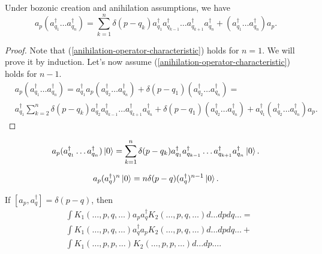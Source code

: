 \documentclass[main.tex]{subfiles}
\begin{document}
\begin{proposition}
Under bozonic creation and anihilation assumptions, we have
\begin{equation}
\label{anihilation-operator-characteristic}
a_p (a_{q_1}^\dagger \dots a_{q_n}^\dagger) = \sum_{k=1}^n\delta(p - q_k) a_{q_1}^\dagger a_{q_{k - 1}}^\dagger \dots a_{q_{k + 1}}^\dagger a_{q_n}^\dagger + (a_{q_1}^\dagger \dots a_{q_n}^\dagger)a_p.
\end{equation}
\end{proposition}
\begin{proof}
Note that (\ref{anihilation-operator-characteristic}) holds for $n = 1$. We will prove it by induction. Let's now assume (\ref{anihilation-operator-characteristic}) holds for $n - 1$.
\begin{align*}
& a_p (a_{q_1}^\dagger \dots a_{q_n}^\dagger)=
a_{q_1}^\dagger a_p (a_{q_2}^\dagger \dots a_{q_n}^\dagger) + \delta(p - q_1) (a_{q_2}^\dagger \dots a_{q_n}^\dagger)= \\
& a_{q_1}^\dagger\sum_{k=2}^n\delta(p - q_k) a_{q_2}^\dagger a_{q_{k - 1}}^\dagger \dots a_{q_{k + 1}}^\dagger a_{q_n}^\dagger + \delta(p - q_1) (a_{q_2}^\dagger \dots a_{q_n}^\dagger) + a_{q_1}^\dagger (a_{q_2}^\dagger \dots a_{q_n}^\dagger)a_p.
\end{align*} 
\end{proof}

\begin{corollary}
\begin{equation}
a_p (a_{q_1}^\dagger \dots a_{q_n}^\dagger) \ket{0} = \sum_{k=1}^n\delta(p - q_k) a_{q_1}^\dagger a_{q_{k - 1}}^\dagger \dots a_{q_{k + 1}}^\dagger a_{q_n}^\dagger \ket{0}.
\end{equation}
\end{corollary}

\begin{corollary}
\begin{equation}
a_p (a_{q}^\dagger)^n \ket{0} = n \delta(p - q) (a_{q}^\dagger)^{n-1} \ket{0}.
\end{equation}
\end{corollary}

\begin{lemma}
If $[a_p, a^\dagger_q] = \delta(p - q)$, then
\begin{align*}
&\int K_1(\dots, p, q, \dots) a_p a^\dagger_q K_2(\dots, p, q, \dots) d \dots dpdq \ldots = \\
&\int K_1(\dots, p, q, \dots) a^\dagger_q a_p K_2(\dots, p, q, \dots) d \dots dpdq \ldots + \\ 
&\int K_1(\dots, p, p, \dots)K_2(\dots, p,p, \dots)d \dots dp \dots.
\end{align*}
\end{lemma}
\end{document}
